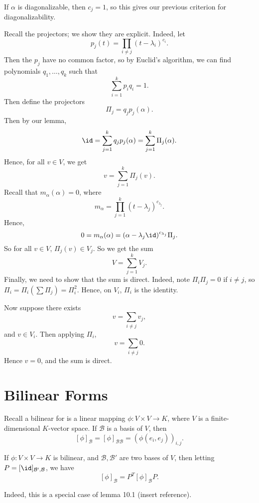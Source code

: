 \documentclass[12pt]{article}
\begin{document}
\begin{remark}
	If $\alpha$ is diagonalizable, then $c_j = 1$, so this gives our previous criterion for diagonalizability.
\end{remark}

\begin{proofbox}
	Recall the projectors; we show they are explicit. Indeed, let
	\[
		p_j(t) = \prod_{i \neq j}(t - \lambda_i)^{c_i}
	.\]
	Then the $p_j$ have no common factor, so by Euclid's algorithm, we can find polynomials $q_1, \ldots, q_k$ such that
	\[
	\sum_{i = 1}^{k} p_i q_i = 1
	.\]
	Then define the projectors
	\[
		\Pi_j = q_j p_j (\alpha)
	.\]
	Then by our lemma,
	\[
		\id = \sum_{j = 1}^{k} q_j p_j (\alpha) = \sum_{j = 1}^{k} \Pi_j(\alpha)
	.\]
	Hence, for all $v \in V$, we get
	\[
		v = \sum_{j = 1}^{k} \Pi_j(v)
	.\]
	Recall that $m_{\alpha}(\alpha) = 0$, where
	\[
		m_{\alpha} = \prod_{j = 1}^{k}(t - \lambda_j)^{c_{\lambda_j}}
	.\]
	Hence,
	\[
		0 = m_{\alpha}(\alpha) = (\alpha - \lambda_j \id)^{c_{\lambda_j}} \Pi_j
	.\]
	So for all $v \in V$, $\Pi_j(v) \in V_j$. So we get the sum
	\[
	V = \sum_{j = 1}^{k} V_j
	.\]
	Finally, we need to show that the sum is direct. Indeed, note $\Pi_i \Pi_j = 0$ if $i \neq j$, so $\Pi_i= \Pi_i ( \sum \Pi_j) = \Pi_i^2$. Hence, on $V_{i}$, $\Pi_i$ is the identity.

	Now suppose there exists
	\[
	v = \sum_{i \neq j} v_j
	,\]
	and $v \in V_i$. Then applying $\Pi_i$,
	\[
	v = \sum_{i \neq j} 0
	.\]
	Hence $v = 0$, and the sum is direct.
\end{proofbox}

\newpage

\section{Bilinear Forms}%
\label{sec:bilinear_forms}

Recall a bilinear for is a linear mapping $\phi : V \times V \to K$, where $V$ is a finite-dimensional $K$-vector space. If $\mathcal{B}$ is a basis of $V$, then
\[
	[\phi]_{\mathcal{B}} = [\phi]_{\mathcal{B}\mathcal{B}} = (\phi(e_i, e_j))_{i,j}
.\]

\begin{lemma}
	If $\phi : V \times V \to K$ is bilinear, and $\mathcal{B}, \mathcal{B}'$ are two bases of $V$, then letting $P = [\id]_{\mathcal{B}',\mathcal{B}}$, we have
	\[
		[\phi]_{\mathcal{B}} = P^{T}[\phi]_{\mathcal{B}}P
	.\] 
\end{lemma}

Indeed, this is a special case of lemma 10.1 (insert reference).
\end{document}
